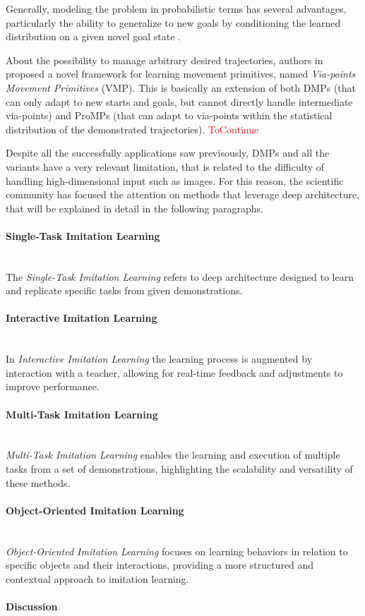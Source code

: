 Generally, modeling the problem in probabilistic terms has several advantages, particularly the ability to generalize to new goals by conditioning the learned distribution on a given novel goal state \cite{saveriano2023dynamic}.

About the possibility to manage arbitrary desired trajectories, authors in \cite{zhou2019learning} proposed a novel framework for learning movement primitives, named \textit{Via-points Movement Primitives} (VMP). This is basically an extension of both DMPs (that can only adapt to new starts and goals, but cannot directly handle intermediate via-points) and ProMPs (that can adapt to via-points within the statistical distribution of the demonstrated trajectories).
\textcolor{red}{ToContinue}

Despite all the successfully applications saw previsously, DMPs and all the variants have a very relevant limitation, that is related to the difficulty of handling high-dimensional input such as images. For this reason, the scientific community has focused the attention on methods that leverage deep architecture, that will be explained in detail in the following paragraphs.

\paragraph*{Single-Task Imitation Learning}\mbox{}\\
The \textit{Single-Task Imitation Learning} refers to deep architecture designed to learn and replicate specific tasks from given demonstrations.
\paragraph*{Interactive Imitation Learning}\mbox{}\\
In \textit{Interactive Imitation Learning} the learning process is augmented by interaction with a teacher, allowing for real-time feedback and adjustments to improve performance.
\paragraph*{Multi-Task Imitation Learning}\mbox{}\\
\textit{Multi-Task Imitation Learning} enables the learning and execution of multiple tasks from a set of demonstrations, highlighting the scalability and versatility of these methods.
\paragraph*{Object-Oriented Imitation Learning}\mbox{}\\
\textit{Object-Oriented Imitation Learning} focuses on learning behaviors in relation to specific objects and their interactions, providing a more structured and contextual approach to imitation learning.

\paragraph{Discussion}
